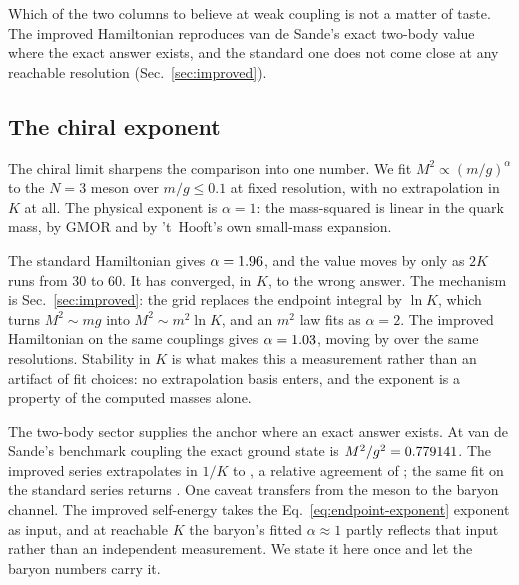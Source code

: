 Which of the two columns to believe at weak coupling is not a matter of
taste.  The improved Hamiltonian reproduces van de Sande's exact two-body
value where the exact answer exists, and the standard one does not come
close at any reachable resolution (Sec.~\ref{sec:improved}).

\subsection{The chiral exponent}
\label{sec:chiral-exponent}

The chiral limit sharpens the comparison into one number.  We fit
$M^2 \propto (m/g)^{\alpha}$ to the $N = 3$ meson over $m/g \le 0.1$ at
fixed resolution, with no extrapolation in $K$ at all.  The physical
exponent is $\alpha = 1$: the mass-squared is linear in the quark mass, by
GMOR and by 't~Hooft's own small-mass expansion.

The standard Hamiltonian gives $\alpha = 1.96$, and the value
moves by only \numAlphaStandardDrift{} as $2K$ runs from 30 to 60.  It has
converged, in $K$, to the wrong answer.  The mechanism is
Sec.~\ref{sec:improved}: the grid replaces the endpoint integral by
$\ln K$, which turns $M^2 \sim mg$ into $M^2 \sim m^2 \ln K$, and an
$m^2$ law fits as $\alpha = 2$.  The improved Hamiltonian on the same
couplings gives $\alpha = 1.03$, moving by
\numAlphaImprovedDrift{} over the same resolutions.  Stability in $K$ is
what makes this a measurement rather than an artifact of fit choices: no
extrapolation basis enters, and the exponent is a property of the computed
masses alone.

The two-body sector supplies the anchor where an exact answer exists.  At
van de Sande's benchmark coupling the exact ground state is
$M^2/g^2 = 0.779141$.  The improved series extrapolates in $1/K$
to \numTwoBodyImproved, a relative agreement of \numTwoBodyImprovedRel;
the same fit on the standard series returns \numTwoBodyStandard.  One
caveat transfers from the meson to the baryon channel.  The improved
self-energy takes the Eq.~\eqref{eq:endpoint-exponent} exponent as input,
and at reachable $K$ the baryon's fitted $\alpha \approx 1$ partly reflects
that input rather than an independent measurement.  We state it here once
and let the baryon numbers carry it.


